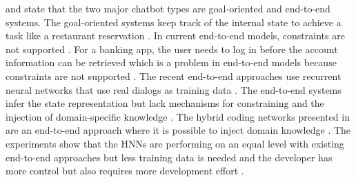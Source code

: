 \citet{williams2017hybrid} and \citet{bordes2016learning} state that the two major chatbot types are goal-oriented and end-to-end systems.
The goal-oriented systems keep track of the internal state to achieve a task like a restaurant reservation \cite{williams2017hybrid}. 
In current end-to-end models, constraints are not supported \cite{williams2017hybrid}. For a banking app, the user needs to log in before the account information can be retrieved which is a problem in end-to-end models because constraints are not supported \cite{williams2017hybrid}.
The recent end-to-end approaches use recurrent neural networks that use real dialogs as training data \cite{williams2017hybrid}. The end-to-end systems infer the state representation but lack mechanisms for constraining and the injection of domain-specific knowledge \cite{williams2017hybrid}.
The hybrid coding networks presented in \citet{williams2017hybrid} are an end-to-end approach where it is possible to inject domain knowledge \cite{williams2017hybrid}. The experiments show that the HNNs are performing on an equal level with existing end-to-end approaches but less training data is needed and the developer has more control but also requires more development effort \cite{williams2017hybrid}.

